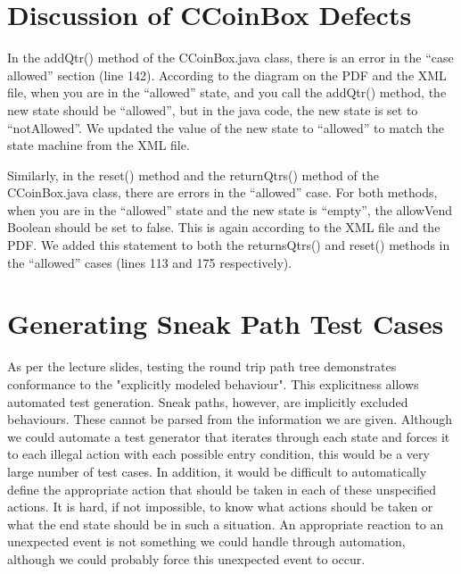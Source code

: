 \documentclass[11pt, a4paper]{article}
\begin{document}
\section{Discussion of CCoinBox Defects}
In the addQtr() method of the CCoinBox.java class, there is an error in the “case allowed” section (line 142). According to the diagram on the PDF and the XML file, when you are in the “allowed” state, and you call the addQtr() method, the new state should be “allowed”, but in the java code, the new state is set to “notAllowed”. We updated the value of the new state to “allowed” to match the state machine from the XML file. 

Similarly, in the reset() method and the returnQtrs() method of the CCoinBox.java class, there are errors in the “allowed” case. For both methods, when you are in the “allowed” state and the new state is “empty”, the allowVend Boolean should be set to false. This is again according to the XML file and the PDF. We added this statement to both the returnsQtrs() and reset() methods in the “allowed” cases (lines 113 and 175 respectively). 

\section{Generating Sneak Path Test Cases}
As per the lecture slides, testing the round trip path tree demonstrates conformance to the "explicitly modeled behaviour". This explicitness allows automated test generation. Sneak paths, however, are implicitly excluded behaviours. These cannot be parsed from the information we are given. Although we could automate a test generator that iterates through each state and forces it to each illegal action with each possible entry condition, this would be a very large number of test cases. In addition, it would be difficult to automatically define the appropriate action that should be taken in each of these unspecified actions. It is hard, if not impossible, to know what actions should be taken or what the end state should be in such a situation. An appropriate reaction to an unexpected event is not something we could handle through automation, although we could probably force this unexpected event to occur. 

\end{document}
